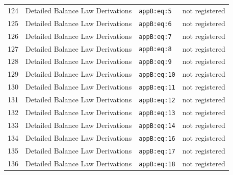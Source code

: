 \begin{longtable}{@{}p{1.1cm}p{5.6cm}p{3.4cm}p{2.9cm}@{}}
124 & Detailed Balance Law Derivations & \texttt{appB:eq:5} & not registered \\
125 & Detailed Balance Law Derivations & \texttt{appB:eq:6} & not registered \\
126 & Detailed Balance Law Derivations & \texttt{appB:eq:7} & not registered \\
127 & Detailed Balance Law Derivations & \texttt{appB:eq:8} & not registered \\
128 & Detailed Balance Law Derivations & \texttt{appB:eq:9} & not registered \\
129 & Detailed Balance Law Derivations & \texttt{appB:eq:10} & not registered \\
130 & Detailed Balance Law Derivations & \texttt{appB:eq:11} & not registered \\
131 & Detailed Balance Law Derivations & \texttt{appB:eq:12} & not registered \\
132 & Detailed Balance Law Derivations & \texttt{appB:eq:13} & not registered \\
133 & Detailed Balance Law Derivations & \texttt{appB:eq:14} & not registered \\
134 & Detailed Balance Law Derivations & \texttt{appB:eq:16} & not registered \\
135 & Detailed Balance Law Derivations & \texttt{appB:eq:17} & not registered \\
136 & Detailed Balance Law Derivations & \texttt{appB:eq:18} & not registered \\
\end{longtable}
